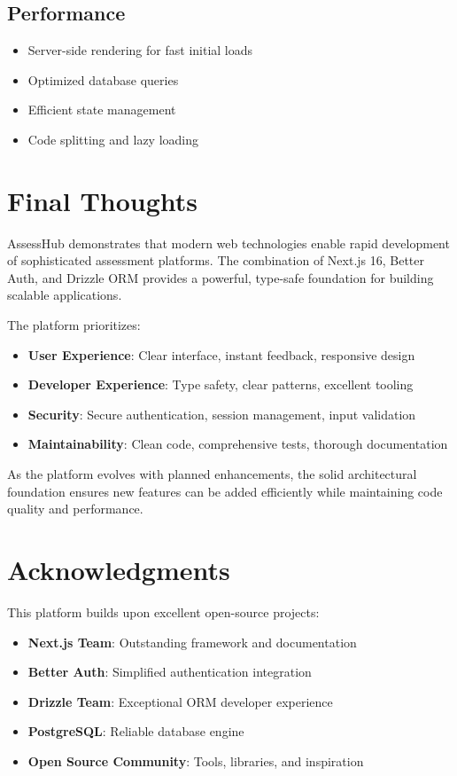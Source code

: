 \documentclass[12pt,a4paper]{report}
\begin{document}
\subsection{Performance}

\begin{itemize}
    \item Server-side rendering for fast initial loads
    \item Optimized database queries
    \item Efficient state management
    \item Code splitting and lazy loading
\end{itemize}

\section{Final Thoughts}

AssessHub demonstrates that modern web technologies enable rapid development of sophisticated assessment platforms. The combination of Next.js 16, Better Auth, and Drizzle ORM provides a powerful, type-safe foundation for building scalable applications.

The platform prioritizes:
\begin{itemize}
    \item \textbf{User Experience}: Clear interface, instant feedback, responsive design
    \item \textbf{Developer Experience}: Type safety, clear patterns, excellent tooling
    \item \textbf{Security}: Secure authentication, session management, input validation
    \item \textbf{Maintainability}: Clean code, comprehensive tests, thorough documentation
\end{itemize}

As the platform evolves with planned enhancements, the solid architectural foundation ensures new features can be added efficiently while maintaining code quality and performance.

\section{Acknowledgments}

This platform builds upon excellent open-source projects:

\begin{itemize}
    \item \textbf{Next.js Team}: Outstanding framework and documentation
    \item \textbf{Better Auth}: Simplified authentication integration
    \item \textbf{Drizzle Team}: Exceptional ORM developer experience
    \item \textbf{PostgreSQL}: Reliable database engine
    \item \textbf{Open Source Community}: Tools, libraries, and inspiration
\end{itemize}
\end{document}
